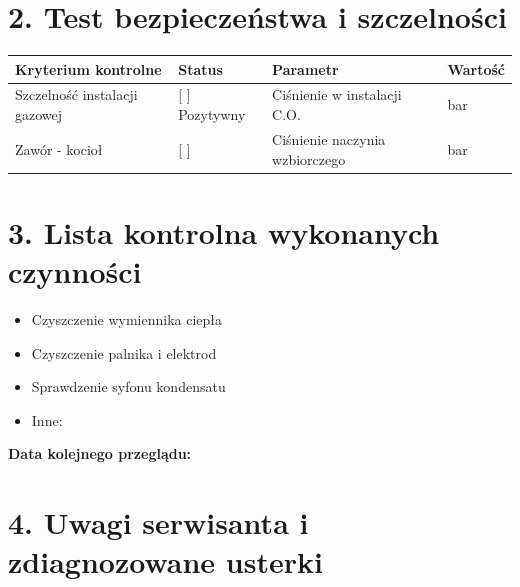 \documentclass[10pt, a4paper]{article}
\begin{document}
\vspace{0.5cm}

\section*{2. Test bezpieczeństwa i szczelności}
\noindent
\begin{tabularx}{\textwidth}{X l X l}
\toprule
\textbf{Kryterium kontrolne} & \textbf{Status} & \textbf{Parametr} & \textbf{Wartość} \\
\midrule
Szczelność instalacji gazowej & [ \hspace{0.3cm} ] Pozytywny & Ciśnienie w instalacji C.O. & \dotfill bar \\
Zawór - kocioł & [ \hspace{0.3cm} ] & Ciśnienie naczynia wzbiorczego & \dotfill bar \\
\bottomrule
\end{tabularx}

\vspace{0.5cm}

\section*{3. Lista kontrolna wykonanych czynności}
\noindent
\begin{itemize}[label={[\hspace{0.4cm}]}]
    \item Czyszczenie wymiennika ciepła
    \item Czyszczenie palnika i elektrod
    \item Sprawdzenie syfonu kondensatu
    \item Inne: \dotfill
\end{itemize}
\vspace{0.2cm}
\noindent \textbf{Data kolejnego przeglądu:} \dotfill

\vspace{0.5cm}

\section*{4. Uwagi serwisanta i zdiagnozowane usterki}
\noindent
{}
\end{document}
